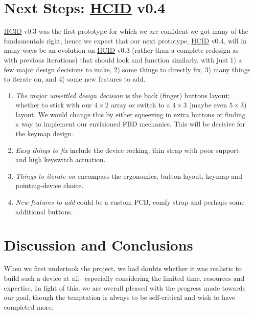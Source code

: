 \documentclass[logo,bsc,singlespacing,parskip]{infthesis}
\begin{document}
\chapter{Next Steps: \hyperref[org0c83164]{HCID} v0.4}
\label{sec:orgf0596d4}
\hyperref[org0c83164]{HCID} v0.3 was the first prototype for which we are confident we got  many of the fundamentals right, hence we expect that our next prototype,  \hyperref[org0c83164]{HCID} v0.4, will in many ways be an evolution on \hyperref[org0c83164]{HCID} v0.3 (rather than a complete redesign as with previous iterations) that should look and function similarly, with just 1) a few major design decisions to make, 2) some things to directly fix, 3) many things to iterate on, and  4) some new features to add.

\begin{enumerate}
\item \emph{The major unsettled design decision} is the back (finger) buttons layout; whether to stick with our \(4\times2\) array or switch to a \(4\times3\) (maybe even \(5\times3\)) layout.
We would change this by either squeezing in extra buttons or finding a way to implement our envisioned FBD mechanics. This will be decisive for the keymap design.

\item \emph{Easy things to fix} include the device rocking, thin strap with poor support and high keyswitch actuation.

\item \emph{Things to iterate on} encompass the ergonomics, button layout, keymap and pointing-device choice.

\item \emph{New features to add} could be a custom PCB, comfy strap and perhaps some additional buttons.
\end{enumerate}

{}
\chapter*{Discussion and Conclusions}
\label{sec:org68cb77f}
When we first undertook the project, we had doubts whether it was realistic to build such a device at all-- especially considering the limited time, resources and expertise.
In light of this, we are overall pleased with the progress made towards our goal, though the temptation is always to be self-critical and wish to have completed more.
\end{document}
